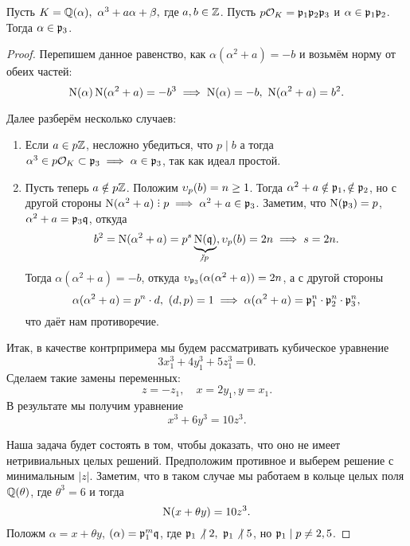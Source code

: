 	   

	  \begin{statement}[ДЗ 11, задача 3]\label{prop-alpha} 
	  	Пусть $K = \mathbb{Q}(\alpha), \ \alpha^3 + a \alpha + \beta,$ где $a, b \in \mathbb{Z}$. Пусть $p\mathcal{O}_{K} = \mathfrak{p}_1 \mathfrak{p}_2 \mathfrak{p}_3$ и $\alpha \in \mathfrak{p}_1 \mathfrak{p}_2$. Тогда $\alpha \in \mathfrak{p}_3$.
	  \end{statement}
	  \begin{proof}
	  	Перепишем данное равенство, как $\alpha(\alpha^2 + a) = - b$ и возьмём норму от обеих частей: 
	  	\[
	  		\operatorname{\mathrm{N}}(\alpha)\operatorname{\mathrm{N}}(\alpha^2 + a) = - b^3 \implies \operatorname{\mathrm{N}}(\alpha) = -b, \ \operatorname{\mathrm{N}}(\alpha^2 + a) = b^2. 
	  	\]

	  	Далее разберём несколько случаев: 
	  	\begin{enumerate}
	  		\item Если $a \in p\mathbb{Z}$, несложно убедиться, что $p \mid b$ а тогда $\alpha^3 \in p\mathcal{O}_{K} \subset \mathfrak{p}_{3} \implies \alpha \in \mathfrak{p}_{3}$, так как идеал простой. 

	  		\item Пусть теперь $a \notin p\mathbb{Z}$. Положим $\upsilon_{p}(b) = n \ge 1$. Тогда $\alpha^2 + a \notin \mathfrak{p}_1, \notin \mathfrak{p}_{2}$, но с другой стороны $\Nm(\alpha^2 + a) \divby p \implies \alpha^2 + a \in \fp_{3}$. Заметим, что $\operatorname{\mathrm{N}}(\mathfrak{p}_3) = p$, $\alpha^2 + a = \mathfrak{p}_{3} \mathfrak{q}$, откуда 
	  		\[
	  			b^2 = \Nm(\alpha^2 + a) = p^s \underbrace{\Nm(\fq)}_{\notdivby p}, \v_{p}(b) = 2n \implies s = 2n. 
	  		\]
	  		Тогда $\alpha(\alpha^2 + a) = -b$, откуда $\upsilon_{\mathfrak{p}_3}(\alpha(\alpha^2 + a)) = 2n$, а с другой стороны
	  		\[
	  		  	\alpha(\alpha^2 + a) = p^n \cdot d, \ (d, p ) = 1 \implies \alpha(\alpha^2 + a) = \mathfrak{p}_1^n \cdot \mathfrak{p}_2^n \cdot \mathfrak{p}_{3}^n,
	  		  \]  
	  		  что даёт нам противоречие. 
	  		
	  	\end{enumerate}




	  	Итак, в качестве контрпримера мы будем рассматривать кубическое уравнение 
	  	\[
	  		3x_1^3 + 4y_1^3 + 5z_1^3 = 0.
	  	\]
	  	Сделаем такие замены переменных: 
	  	\[
	  		z = -z_1, \quad x = 2y_1, y = x_1.
	  	\]
	  	В результате мы получим уравнение 
	  	\[
	  		x^3 + 6y^3 = 10z^3.
	  	\]

	  	Наша задача будет состоять в том, чтобы доказать, что оно не имеет нетривиальных целых решений. Предположим противное и выберем решение с минимальным $|z|$. Заметим, что в таком случае мы работаем в кольце целых поля $\mathbb{Q}(\theta)$, где $\theta^3 = 6$ и тогда 
	  	\[
	  		\operatorname{\mathrm{N}}(x + \theta y) = 10z^3.
	  	\]
	  	Положм $\alpha = x + \theta y$, $(\alpha) = \mathfrak{p}_1^m \mathfrak{q}$, где $\mathfrak{p}_1 \not\ \mid 2, \ \mathfrak{p}_1 \not\ \mid 5$, но $\mathfrak{p}_1 \mid p \neq 2, 5$.


\end{proof}

